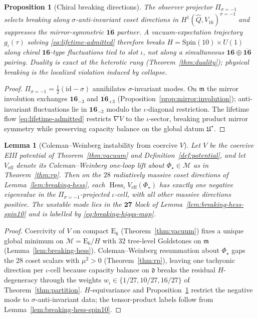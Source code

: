 \documentclass[11pt]{article}
\theoremstyle{plain}
\newtheorem{lemma}[theorem]{Lemma}
\newtheorem{proposition}[theorem]{Proposition}
\theoremstyle{definition}
\theoremstyle{remark}
\numberwithin{equation}{section}
\newcommand{\E}[1]{\mathrm{E}_{#1}}
\newcommand{\Spin}{\mathrm{Spin}}
\newcommand{\orderparam}{\Phi}
\newcommand{\Hess}{\operatorname{Hess}}
\begin{document}
\begin{proposition}[Chiral breaking directions]\label{prop:breaking-chiral}
The observer projector $\Pi_{\sigma=-1}$ selects breaking along
$\sigma$-anti-invariant coset directions in
$H^1(\hat Q,V_{16})^{\sigma=-1}$ and suppresses the mirror-symmetric
$\overline{\mathbf{16}}$ partner. A vacuum-expectation trajectory $g_\iota(\tau)$
solving \eqref{eq:lifetime-admitted} therefore breaks
$H=\Spin(10)\times U(1)$ along chiral $\mathbf{16}$-type fluctuations tied to
slot $\iota$, not along a simultaneous
$\mathbf{16}\oplus\overline{\mathbf{16}}$ pairing. Duality is exact at the
heterotic rung (Theorem~\ref{thm:duality}); physical breaking is the localized
violation induced by collapse.
\end{proposition}

\begin{proof}
$\Pi_{\sigma=-1}=\tfrac12(\mathrm{id}-\sigma)$ annihilates $\sigma$-invariant
modes. On $\mathfrak{m}$ the mirror involution exchanges
$\mathbf{16}_{-3}$ and $\overline{\mathbf{16}}_{+3}$
(Proposition~\ref{prop:mirror:involution}); anti-invariant fluctuations lie in
$\mathbf{16}_{-3}$ modulo the $\iota$-diagonal restriction. The lifetime flow
\eqref{eq:lifetime-admitted} restricts $\nabla V$ to the $\iota$-sector,
breaking product mirror symmetry while preserving capacity balance on the global
datum $\mathfrak{U}^\star$.
\end{proof}

\begin{lemma}[Coleman--Weinberg instability from coercive $V$]
\label{lem:breaking-cw}
Let $V$ be the coercive EIII potential of Theorem~\ref{thm:vacuum}
and Definition~\ref{def:potential}, and let $V_{\mathrm{eff}}$ denote its Coleman--Weinberg
one-loop lift about $\orderparam_\star\in\mathcal{M}$ as in
Theorem~\ref{thm:rp}. Then on the $28$ radiatively massive coset directions of
Lemma~\ref{lem:breaking-hess}, each $\Hess_\iota V_{\mathrm{eff}}(\orderparam_\star)$
has exactly one negative eigenvalue in the
$\Pi_{\sigma=-1}$-projected $\iota$-cell, with all other massive directions
positive. The unstable mode lies in the $\mathbf{27}$ block of
Lemma~\ref{lem:breaking-hess-spin10} and is labelled by
\eqref{eq:breaking-higgs-map}.
\end{lemma}

\begin{proof}
Coercivity of $V$ on compact $\E{6}$ (Theorem~\ref{thm:vacuum}) fixes a unique
global minimum on $\mathcal{M}=\E{6}/H$ with $32$ tree-level Goldstones on
$\mathfrak{m}$ (Lemma~\ref{lem:breaking-hess}). Coleman--Weinberg resummation
about $\orderparam_\star$ gaps the $28$ coset scalars with $\mu^2>0$
(Theorem~\ref{thm:rp}), leaving one tachyonic direction per $\iota$-cell because
capacity balance on $\mathfrak{d}$ breaks the residual $H$-degeneracy through
the weights $w_\iota\in\{1/27,10/27,16/27\}$ of Theorem~\ref{thm:partition}.
$H$-equivariance and Proposition~\ref{prop:breaking-chiral} restrict the
negative mode to $\sigma$-anti-invariant data; the tensor-product labels follow
from Lemma~\ref{lem:breaking-hess-spin10}.
\end{proof}
\end{document}
